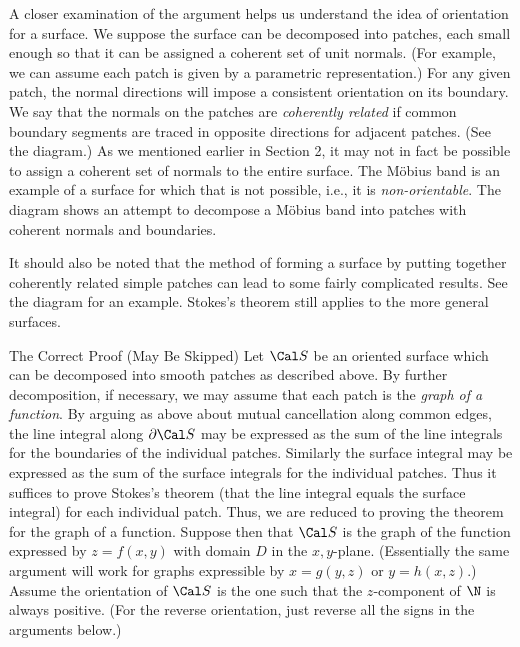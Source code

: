 A closer examination of the argument helps us understand the
idea of orientation for a surface.   We suppose the surface
can be decomposed into patches,  each small enough so that
it can be assigned a coherent set of unit normals.  (For example,
 we can assume each patch is given by a parametric representation.)
For any given patch, the normal directions will impose a
consistent orientation on its boundary.   We say that the
normals on the patches are {\it coherently related\/} if
common boundary segments are traced in opposite directions
for adjacent patches.  (See the diagram.)
As we mentioned earlier in Section 2,
it may not in fact be possible to assign a coherent set of
normals to the entire surface.  The M\"obius band is an
example of a surface for which that is not
possible, i.e., it is {\it non-orientable}.  The diagram shows an attempt to decompose
a M\"obius band into patches with coherent normals and
boundaries.
\medskip
\centerline{}
\medskip
It should also be noted that the method of forming a surface
by putting together coherently related simple patches can lead to some
fairly complicated results.  See the diagram for
an example.  Stokes's theorem still applies to the more
general surfaces.

\subhead The Correct Proof {\rm(May Be Skipped)} \endsubhead
Let $\Cal S$ be an oriented surface which can be decomposed into 
smooth patches as described above.  By further decomposition,
if necessary, we may assume that each patch is the {\it
graph of a function}.   By arguing as above about mutual
cancellation along common edges, the line integral
along $\partial \Cal S$ may be expressed as the sum of the
line integrals for the boundaries of the individual patches.
Similarly the surface integral may be expressed as the sum of
the surface integrals for the individual patches.  Thus it
suffices to prove Stokes's theorem (that the line integral
equals the surface integral) for each individual patch.
Thus, we are reduced to proving the theorem for the
graph of a function.
	Suppose then that $\Cal S$ is the graph of the
function expressed by $z = f(x,y)$ with domain $D$ in the
$x,y$-plane.  (Essentially the same argument will work for
graphs expressible by  $x = g(y,z)$ or $y = h(x,z)$.)
Assume the orientation of $\Cal S$ is the one such that
the $z$-component of $\N$ is always positive.  (For the reverse
orientation, just reverse all the signs in the arguments
below.)

